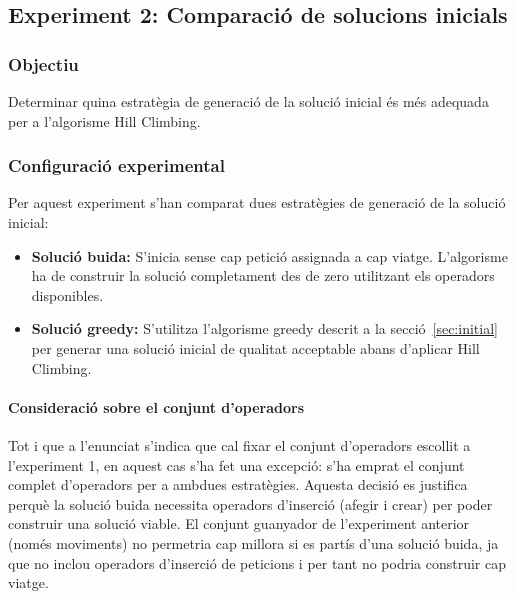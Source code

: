 \subsection{Experiment 2: Comparació de solucions inicials}

\vspace{0.5cm}

\subsubsection{Objectiu}
Determinar quina estratègia de generació de la solució inicial és més adequada per a l'algorisme Hill Climbing.

\vspace{0.5cm}


\subsubsection{Configuració experimental}

Per aquest experiment s'han comparat dues estratègies de generació de la solució inicial:

\begin{itemize}
    \item \textbf{Solució buida:} S'inicia sense cap petició assignada a cap viatge. L'algorisme ha de construir la solució completament des de zero utilitzant els operadors disponibles.
    
    \item \textbf{Solució greedy:} S'utilitza l'algorisme greedy descrit a la secció~\ref{sec:initial} per generar una solució inicial de qualitat acceptable abans d'aplicar Hill Climbing.
\end{itemize}

\paragraph{Consideració sobre el conjunt d'operadors}

Tot i que a l'enunciat s'indica que cal fixar el conjunt d'operadors escollit a l'experiment 1, en aquest cas s'ha fet una excepció: s'ha emprat el conjunt complet d'operadors per a ambdues estratègies. Aquesta decisió es justifica perquè la solució buida necessita operadors d'inserció (afegir i crear) per poder construir una solució viable. El conjunt guanyador de l'experiment anterior (només moviments) no permetria cap millora si es partís d'una solució buida, ja que no inclou operadors d'inserció de peticions i per tant no podria construir cap viatge.


